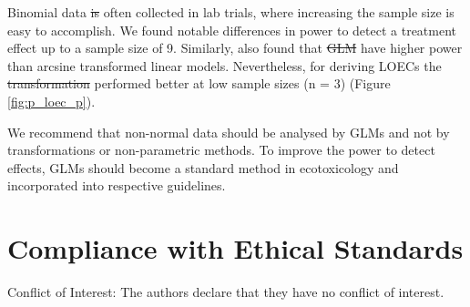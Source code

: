 \documentclass[twocolumn, natbib]{svjour3}
\providecommand{\DIFadd}[1]{{\protect\color{blue}\uwave{#1}}} %
\providecommand{\DIFdel}[1]{{\protect\color{red}\sout{#1}}}                      %
\providecommand{\DIFaddbegin}{} %
\providecommand{\DIFaddend}{} %
\providecommand{\DIFdelbegin}{} %
\providecommand{\DIFdelend}{} %
\begin{document}
Binomial data \DIFdelbegin \DIFdel{is }\DIFdelend \DIFaddbegin \DIFadd{are }\DIFaddend often collected in lab trials, where increasing the sample size is easy to accomplish. 
We found notable differences in power to detect a treatment effect up to a sample size of 9.
Similarly, \citet{warton_arcsine_2011} also found that \DIFdelbegin \DIFdel{GLM }\DIFdelend \DIFaddbegin \DIFadd{GLMs }\DIFaddend have higher power than arcsine transformed linear models.
Nevertheless, for deriving LOECs the \DIFdelbegin \DIFdel{transformation }\DIFdelend \DIFaddbegin \DIFadd{$LM$ }\DIFaddend performed better at low sample sizes (n = 3) (Figure \ref{fig:p_loec_p}). 

We recommend that non-normal data should be analysed by GLMs and not by transformations or non-parametric methods.
To improve the power to detect effects, GLMs should become a standard method in ecotoxicology and incorporated into respective guidelines.


\section{Compliance with Ethical Standards}
Conflict of Interest: The authors declare that they have no conflict of interest.



\end{document}
